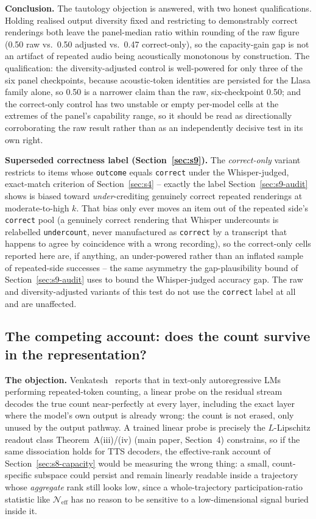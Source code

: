 \documentclass[11pt]{article}
\begin{document}
\textbf{Conclusion.} The tautology objection is answered, with two honest
qualifications. Holding realised output diversity fixed and restricting to
demonstrably correct renderings both leave the panel-median ratio within
rounding of the raw figure (0.50 raw vs.\ 0.50 adjusted
vs.\ 0.47 correct-only), so the capacity-gain gap is not an
artifact of repeated audio being acoustically monotonous by construction. The
qualification: the diversity-adjusted control is well-powered for only three
of the six panel checkpoints, because acoustic-token identities are persisted
for the Llasa family alone, so 0.50 is a narrower claim than the
raw, six-checkpoint 0.50; and the correct-only control has two
unstable or empty per-model cells at the extremes of the panel's capability
range, so it should be read as directionally corroborating the raw result
rather than as an independently decisive test in its own right.

\noindent\textbf{Superseded correctness label (Section~\ref{sec:s9}).} The
\emph{correct-only} variant restricts to items whose \texttt{outcome} equals
\texttt{correct} under the Whisper-judged, exact-match criterion of
Section~\ref{sec:s4} -- exactly the label Section~\ref{sec:s9-audit} shows is
biased toward \emph{under}-crediting genuinely correct repeated renderings at
moderate-to-high $k$. That bias only ever moves an item out of the repeated
side's \texttt{correct} pool (a genuinely correct rendering that Whisper
undercounts is relabelled \texttt{undercount}, never manufactured as
\texttt{correct} by a transcript that happens to agree by coincidence with a
wrong recording), so the correct-only cells reported here are, if anything,
an under-powered rather than an inflated sample of repeated-side successes --
the same asymmetry the gap-plausibility bound of Section~\ref{sec:s9-audit}
uses to bound the Whisper-judged accuracy gap. The raw and
diversity-adjusted variants of this test do not use the \texttt{correct}
label at all and are unaffected.

\subsection{The competing account: does the count survive in the representation?}
\label{sec:s8-probe}

\textbf{The objection.} Venkatesh~\cite{venkatesh2026repeated} reports that in
text-only autoregressive LMs performing repeated-token counting, a linear
probe on the residual stream decodes the true count near-perfectly at every
layer, including the exact layer where the model's own output is already
wrong: the count is not erased, only unused by the output pathway. A trained
linear probe is precisely the $L$-Lipschitz readout class
Theorem~A(iii)/(iv) (main paper, Section~4) constrains, so if the same
dissociation holds for TTS decoders, the effective-rank account of
Section~\ref{sec:s8-capacity} would be measuring the wrong thing: a small, count-specific
subspace could persist and remain linearly readable inside a trajectory whose
\emph{aggregate} rank still looks low, since a whole-trajectory
participation-ratio statistic like $\mathcal{N}_{\mathrm{eff}}$ has no reason
to be sensitive to a low-dimensional signal buried inside it.
\end{document}
